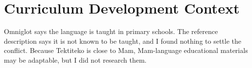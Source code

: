 \documentclass[12pt]{article}
\begin{document}
\section{Curriculum Development Context}
Omniglot says the language is taught in primary schools. The reference description says it is not known to be taught, and I found nothing to settle the conflict. Because Tektiteko is close to Mam, Mam-language educational materials may be adaptable, but I did not research them.
\end{document}
